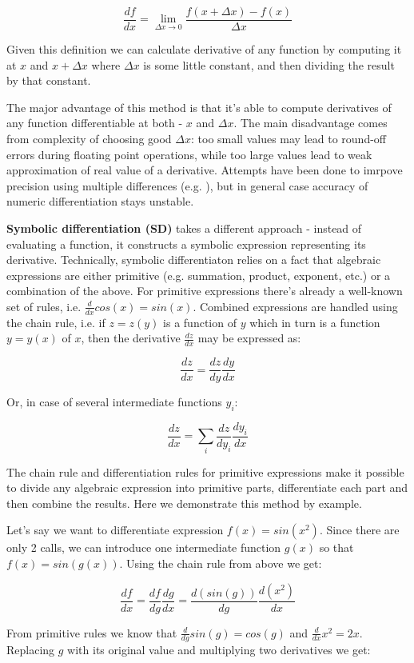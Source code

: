 \documentclass[conference]{IEEEtran}
\begin{document}
$$\frac{df}{dx} = \lim_{\Delta x \to 0} \frac{f(x + \Delta x) - f(x)}{\Delta x}$$

Given this definition we can calculate derivative of any function by
computing it at $x$ and $x + \Delta x$ where $\Delta x$ is some little
constant, and then dividing the result by that constant.

The major advantage of this method is that it's able to compute
derivatives of any function differentiable at both - $x$ and
$\Delta x$. The main disadvantage comes from complexity of choosing
good $\Delta x$: too small values may lead to round-off errors during
floating point operations, while too large values lead to weak
approximation of real value of a derivative. Attempts have been done
to imrpove precision using multiple differences
(e.g. \cite{fornberg1988}), but in general case accuracy of numeric
differentiation stays unstable.

\textbf{Symbolic differentiation (SD)} takes a different approach -
instead of evaluating a function, it constructs a symbolic expression
representing its derivative. Technically, symbolic differentiaton
relies on a fact that algebraic expressions are either primitive
(e.g. summation, product, exponent, etc.) or a combination of the
above. For primitive expressions there's already a well-known set of
rules, i.e. $\frac{d}{dx}cos(x) = sin(x)$. Combined expressions are
handled using the chain rule, i.e. if $z = z(y)$ is a function of $y$
which in turn is a function $y = y(x)$ of $x$, then the derivative
$\frac{dz}{dx}$ may be expressed as:

$$\frac{dz}{dx} = \frac{dz}{dy}\frac{dy}{dx}$$

Or, in case of several intermediate functions $y_i$:

$$\frac{dz}{dx} = \sum_i \frac{dz}{dy_i}\frac{dy_i}{dx}$$

The chain rule and differentiation rules for primitive expressions
make it possible to divide any algebraic expression into primitive
parts, differentiate each part and then combine the results. Here we
demonstrate this method by example.

Let's say we want to differentiate expression $f(x) = sin(x^2)$. Since
there are only 2 calls, we can introduce one intermediate function
$g(x)$ so that $f(x) = sin(g(x))$. Using the chain rule from above we
get:

$$\frac{df}{dx} = \frac{df}{dg}\frac{dg}{dx} = \frac{d(sin(g))}{dg}\frac{d(x^2)}{dx}$$

From primitive rules we know that $\frac{d}{dg}sin(g) = cos(g)$ and
$\frac{d}{dx}x^2 = 2x$. Replacing $g$ with its original value and
multiplying two derivatives we get:
\end{document}
